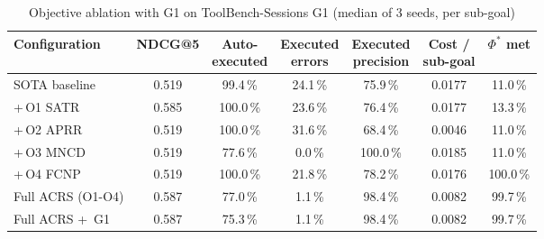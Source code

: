 \begin{table}[htbp]
  \centering
  \caption{Objective ablation with G1 on ToolBench-Sessions G1 (median of 3 seeds, per sub-goal)}
  \label{tab:gtb-ablation}
  \footnotesize\setlength{\tabcolsep}{3pt}
  \begin{tabular}{@{}lcccccc@{}}
    \toprule
    Configuration & NDCG@5 & \makecell{Auto-\\executed} & \makecell{Executed\\errors} & \makecell{Executed\\precision} & \makecell{Cost /\\sub-goal} & \makecell{$\Phi^\ast$\\met} \\
    \midrule
    SOTA baseline & 0.519 & 99.4\,\% & 24.1\,\% & 75.9\,\% & 0.0177 & 11.0\,\% \\
    +\,O1 SATR & 0.585 & 100.0\,\% & 23.6\,\% & 76.4\,\% & 0.0177 & 13.3\,\% \\
    +\,O2 APRR & 0.519 & 100.0\,\% & 31.6\,\% & 68.4\,\% & 0.0046 & 11.0\,\% \\
    +\,O3 MNCD & 0.519 & 77.6\,\% & 0.0\,\% & 100.0\,\% & 0.0185 & 11.0\,\% \\
    +\,O4 FCNP & 0.519 & 100.0\,\% & 21.8\,\% & 78.2\,\% & 0.0176 & 100.0\,\% \\
    Full ACRS (O1-O4) & 0.587 & 77.0\,\% & 1.1\,\% & 98.4\,\% & 0.0082 & 99.7\,\% \\
    Full ACRS +\, G1 & 0.587 & 75.3\,\% & 1.1\,\% & 98.4\,\% & 0.0082 & 99.7\,\% \\
    \bottomrule
  \end{tabular}
\end{table}

